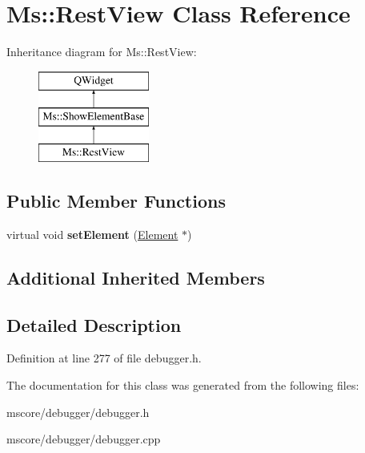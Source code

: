 \hypertarget{class_ms_1_1_rest_view}{}\section{Ms\+:\+:Rest\+View Class Reference}
\label{class_ms_1_1_rest_view}
Inheritance diagram for Ms\+:\+:Rest\+View\+:\begin{figure}[H]
\begin{center}
\leavevmode
\includegraphics[height=3.000000cm]{class_ms_1_1_rest_view}
\end{center}
\end{figure}
\subsection*{Public Member Functions}
\begin{DoxyCompactItemize}
\item 
\mbox{\label{class_ms_1_1_rest_view_ab5fe798f3d2b8072fd042917ed15bf43}} 
virtual void {\bfseries set\+Element} (\hyperlink{class_ms_1_1_element}{Element} $\ast$)
\end{DoxyCompactItemize}
\subsection*{Additional Inherited Members}


\subsection{Detailed Description}


Definition at line 277 of file debugger.\+h.



The documentation for this class was generated from the following files\+:\begin{DoxyCompactItemize}
\item 
mscore/debugger/debugger.\+h\item 
mscore/debugger/debugger.\+cpp\end{DoxyCompactItemize}
